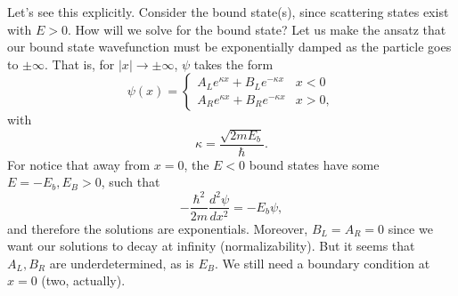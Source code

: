 Let's see this explicitly. Consider the bound state(s), since scattering states exist with $E>0$. How will we solve for the bound state? Let us make the ansatz that our bound state wavefunction must be exponentially damped as the particle goes to $\pm \infty$. That is, for $|x|\to \pm \infty$, $\psi$ takes the form
\begin{equation}
    \psi(x) = \begin{cases}
        A_L e^{\kappa x} + B_L e^{-\kappa x} & x < 0\\
        A_R e^{\kappa x} + B_R e^{-\kappa x} & x > 0,
    \end{cases}
\end{equation}
with 
\begin{equation}
    \kappa = \frac{\sqrt{2mE_b}}{\hbar}.
\end{equation}
For notice that away from $x=0$, the $E<0$ bound states have some $E=-E_b, E_B >0$, such that
\begin{equation}
    -\frac{\hbar^2}{2m}\frac{d^2\psi}{dx^2} = -E_b \psi,
\end{equation}
and therefore the solutions are exponentials. Moreover, $B_L= A_R=0$ since we want our solutions to decay at infinity (normalizability). But it seems that $A_L,B_R$ are underdetermined, as is $E_B$. We still need a boundary condition at $x=0$ (two, actually).

